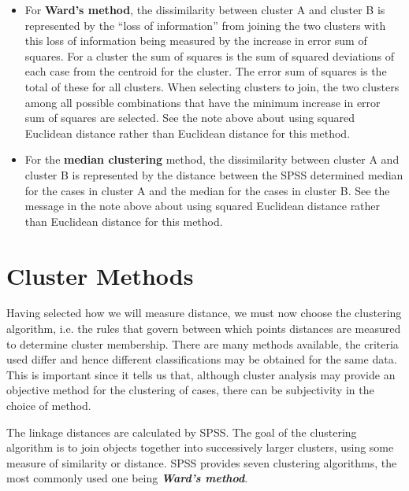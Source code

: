 \documentclass[a4paper,12pt]{article}
\begin{document}
\begin{itemize}
	\item For \textbf{Ward’s method}, the dissimilarity between cluster A and cluster B is represented by the “loss of information” from joining the two clusters with this loss of information being measured by the increase in error sum of squares.  For a cluster the sum of squares is the sum of squared deviations of each case from the centroid for the cluster.  The error sum of squares is the total of these for all clusters.  When selecting clusters to join, the two clusters among all possible combinations that have the minimum increase in error sum of squares are selected.  See the note above about using squared Euclidean distance rather than Euclidean distance for this method.
	
	\item 
	For the \textbf{median clustering} method, the dissimilarity between cluster A and cluster B is represented by the distance between the SPSS determined median for the cases in cluster A and the median for the cases in cluster B.  See the message in the note above about using squared Euclidean distance rather than Euclidean distance for this method.
	
\end{itemize}
\newpage



\section{Cluster Methods}
Having selected how we will measure distance, we must now choose the clustering algorithm, i.e. the rules that govern between which points distances are measured to determine cluster membership. There are many methods available, the criteria used differ and hence
different classifications may be obtained for the same data. This is important since it tells us that, although cluster analysis may provide an objective method for the clustering of cases, there can be subjectivity in the choice of method. 

The linkage distances are calculated by SPSS. The goal of the clustering algorithm is to join objects together into successively larger clusters, using some measure of similarity or distance. SPSS provides seven clustering algorithms, the most commonly used one being  \textbf{\textit{Ward's method}}.
\end{document}
